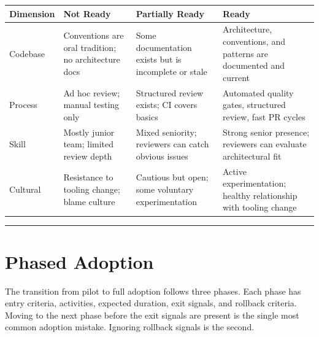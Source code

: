 \documentclass[
  a4paper,
  DIV=11,
  numbers=noendperiod]{scrreprt}
\newcounter{none} %
\begin{document}
{\def\LTcaptype{none} %
\begin{longtable}[]{@{}
  >{\raggedright\arraybackslash}p{}
  >{\raggedright\arraybackslash}p{}
  >{\raggedright\arraybackslash}p{}
  >{\raggedright\arraybackslash}p{}@{}}
\toprule\noalign{}
\begin{minipage}[b]{\linewidth}\raggedright
Dimension
\end{minipage} & \begin{minipage}[b]{\linewidth}\raggedright
Not Ready
\end{minipage} & \begin{minipage}[b]{\linewidth}\raggedright
Partially Ready
\end{minipage} & \begin{minipage}[b]{\linewidth}\raggedright
Ready
\end{minipage} \\
\midrule\noalign{}
\endhead
\bottomrule\noalign{}
\endlastfoot
Codebase & Conventions are oral tradition; no architecture docs & Some
documentation exists but is incomplete or stale & Architecture,
conventions, and patterns are documented and current \\
Process & Ad hoc review; manual testing only & Structured review exists;
CI covers basics & Automated quality gates, structured review, fast PR
cycles \\
Skill & Mostly junior team; limited review depth & Mixed seniority;
reviewers can catch obvious issues & Strong senior presence; reviewers
can evaluate architectural fit \\
Cultural & Resistance to tooling change; blame culture & Cautious but
open; some voluntary experimentation & Active experimentation; healthy
relationship with tooling change \\
\end{longtable}
}

\begin{center}\rule{0.5\linewidth}{0.5pt}\end{center}

\section{Phased Adoption}\label{phased-adoption}

The transition from pilot to full adoption follows three phases. Each
phase has entry criteria, activities, expected duration, exit signals,
and rollback criteria. Moving to the next phase before the exit signals
are present is the single most common adoption mistake. Ignoring
rollback signals is the second.
\end{document}
